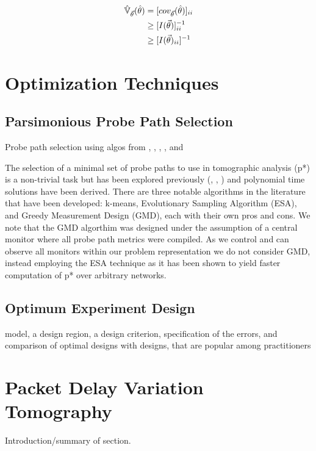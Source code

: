 \begin{align*}
    \operatorname{\hat{\mathbb{V}}}_{\vec{\theta}}(\hat\theta) &= [cov_{\vec{\theta}}(\hat\theta)]_{ii}\\
    &\geq [I(\vec{\theta})]^{-1}_{ii}\\
    &\geq [I(\vec{\theta})_{ii}]^{-1}
\end{align*}


\section{Optimization Techniques}
\label{sec:Boptimization}

\subsection{Parsimonious Probe Path Selection}
\label{ssec:Bparsppselection}
Probe path selection using algos from \cite{lawrence_network_2006}, \cite{rahali_unicast_2019}, \cite{k_deng_delay_2012}, \cite{rahali_unicast_2019}, and \cite{tootaghaj_parsimonious_2018}

The selection of a minimal set of probe paths to use in tomographic analysis (\gls{p*}) is a non-trivial task but has been explored previously (\cite{tootaghaj_parsimonious_2018}, \cite{rahali_unicast_2019}, \cite{he_distributed_2018}) and polynomial time solutions have been derived. There are three notable algorithms in the literature that have been developed: k-means, Evolutionary Sampling Algorithm (ESA), and Greedy Measurement Design (GMD), each with their own pros and cons. We note that the GMD algorthim was designed under the assumption of a central monitor where all probe path metrics were compiled. As we control and can observe all monitors within our problem representation we do not consider GMD, instead employing the ESA technique as it has been shown to yield faster computation of \gls{p*} over arbitrary networks.
    
\subsection{Optimum Experiment Design}
\label{ssec:Boptimumdesigns}

model, a design region, a design criterion, specification of the errors, and comparison of optimal designs with designs, that are popular among practitioners 

\section{Packet Delay Variation Tomography}
\label{sec:Bpdvtomography}
\begin{mdframed}Introduction/summary of section.\end{mdframed}

